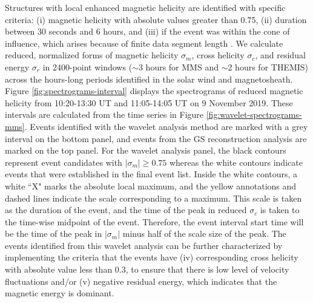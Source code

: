 Structures with local enhanced magnetic helicity are identified with specific criteria: (i) magnetic helicity with absolute values greater than 0.75, (ii) duration between 30 seconds and 6 hours, and (iii) if the event was within the cone of influence, which arises because of finite data segment length \cite{Torrence:1998}. We calculate reduced, normalized forms of magnetic helicity $\sigma_m$, cross helicity $\sigma_c$, and residual energy $\sigma_r$ in 2400-point windows ($\sim$3 hours for MMS and $\sim$2 hours for THEMIS) across the hours-long periods identified in the solar wind and magnetosheath. Figure \ref{fig:spectrograms-interval} displays the spectrograms of reduced magnetic helicity from 10:20-13:30 UT and 11:05-14:05 UT on 9 November 2019. These intervals are calculated from the time series in Figure \ref{fig:wavelet-spectrograms-mms}. Events identified with the wavelet analysis method are marked with a grey interval on the bottom panel, and events from the GS reconstruction analysis are marked on the top panel. For the wavelet analysis panel, the black contours represent event candidates with $|\sigma_m|\geq 0.75$ whereas the white contours indicate events that were established in the final event list. Inside the white contours, a white ``X" marks the absolute local maximum, and the yellow annotations and dashed lines indicate the scale corresponding to a maximum. This scale is taken as the duration of the event, and the time of the peak in reduced $\sigma_c$ is taken to the time-wise midpoint of the event. Therefore, the event interval start time will be the time of the peak in $|\sigma_m|$ minus half of the scale size of the peak. The events identified from this wavelet analysis can be further characterized by implementing the criteria that the events have (iv) corresponding cross helicity with absolute value less than 0.3, to ensure that there is low level of velocity fluctuations and/or (v) negative residual energy, which indicates that the magnetic energy is dominant.
